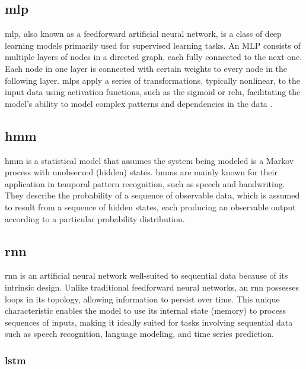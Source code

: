 \subsection{\ac{mlp}}

\ac{mlp}, also known as a feedforward artificial neural network, is a class of deep learning models primarily used for supervised learning tasks.
An MLP consists of multiple layers of nodes in a directed graph, each fully connected to the next one.
Each node in one layer is connected with certain weights to every node in the following layer.
\acp{mlp} apply a series of transformations, typically nonlinear, to the input data using activation functions, such as the sigmoid or \ac{relu}, facilitating the model's ability to model complex patterns and dependencies in the data \cite{goodfellow_deep_2016}.

\subsection{\ac{hmm}}

\ac{hmm} is a statistical model that assumes the system being modeled is a Markov process with unobserved (hidden) states\cite{hmm-rabiner-1989}.
\acp{hmm} are mainly known for their application in temporal pattern recognition, such as speech and handwriting.
They describe the probability of a sequence of observable data, which is assumed to result from a sequence of hidden states, each producing an observable output according to a particular probability distribution.

\subsection{\ac{rnn}}

\ac{rnn} is an artificial neural network well-suited to sequential data because of its intrinsic design.
Unlike traditional feedforward neural networks, an \ac{rnn} possesses loops in its topology, allowing information to persist over time.
This unique characteristic enables the model to use its internal state (memory) to process sequences of inputs, making it ideally suited for tasks involving sequential data such as speech recognition, language modeling, and time series prediction\cite{elman_finding_1990}.

\subsubsection{\ac{lstm}}

